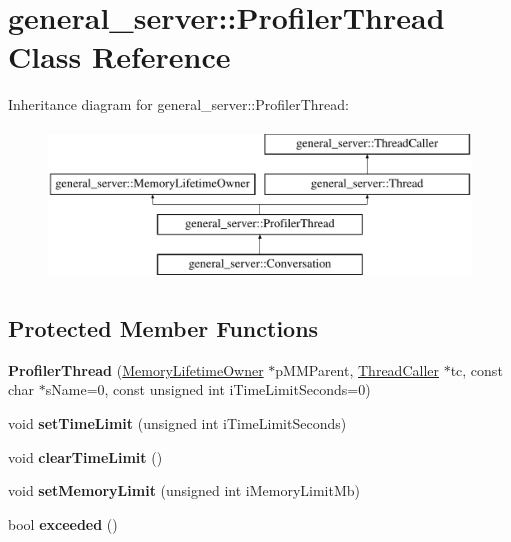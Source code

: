 \hypertarget{classgeneral__server_1_1ProfilerThread}{\section{general\-\_\-server\-:\-:\-Profiler\-Thread \-Class \-Reference}
\label{classgeneral__server_1_1ProfilerThread}
}
\-Inheritance diagram for general\-\_\-server\-:\-:\-Profiler\-Thread\-:\begin{figure}[H]
\begin{center}
\leavevmode
\includegraphics[height=4.000000cm]{classgeneral__server_1_1ProfilerThread}
\end{center}
\end{figure}
\subsection*{\-Protected \-Member \-Functions}
\begin{DoxyCompactItemize}
\item 
\hypertarget{classgeneral__server_1_1ProfilerThread_a285c2e5678362635e34ef97bba25bb15}{{\bfseries \-Profiler\-Thread} (\hyperlink{classgeneral__server_1_1MemoryLifetimeOwner}{\-Memory\-Lifetime\-Owner} $\ast$p\-M\-M\-Parent, \hyperlink{classgeneral__server_1_1ThreadCaller}{\-Thread\-Caller} $\ast$tc, const char $\ast$s\-Name=0, const unsigned int i\-Time\-Limit\-Seconds=0)}\label{classgeneral__server_1_1ProfilerThread_a285c2e5678362635e34ef97bba25bb15}

\item 
\hypertarget{classgeneral__server_1_1ProfilerThread_a20fa8709d04d89b231cb0caa18837882}{void {\bfseries set\-Time\-Limit} (unsigned int i\-Time\-Limit\-Seconds)}\label{classgeneral__server_1_1ProfilerThread_a20fa8709d04d89b231cb0caa18837882}

\item 
\hypertarget{classgeneral__server_1_1ProfilerThread_abaee33be93caf86416f5d8cde27a04c1}{void {\bfseries clear\-Time\-Limit} ()}\label{classgeneral__server_1_1ProfilerThread_abaee33be93caf86416f5d8cde27a04c1}

\item 
\hypertarget{classgeneral__server_1_1ProfilerThread_a7dbe1768f7c969ac74f1cf48e197f855}{void {\bfseries set\-Memory\-Limit} (unsigned int i\-Memory\-Limit\-Mb)}\label{classgeneral__server_1_1ProfilerThread_a7dbe1768f7c969ac74f1cf48e197f855}

\item 
\hypertarget{classgeneral__server_1_1ProfilerThread_ab897ec209aba71d0255e2160af67f071}{bool {\bfseries exceeded} ()}\label{classgeneral__server_1_1ProfilerThread_ab897ec209aba71d0255e2160af67f071}

\end{DoxyCompactItemize}
